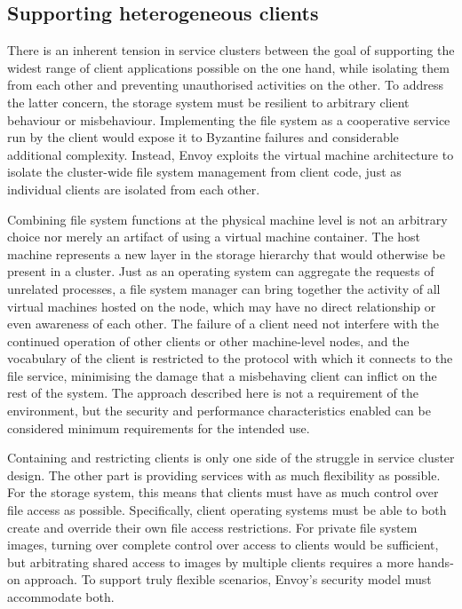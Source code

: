 \subsection{Supporting heterogeneous clients}

There is an inherent tension in service clusters between the goal of supporting the widest range of client applications possible on the one hand, while isolating them from each other and preventing unauthorised activities on the other. To address the latter concern, the storage system must be resilient to arbitrary client behaviour or misbehaviour. Implementing the file system as a cooperative service run by the client would expose it to Byzantine failures and considerable additional complexity. Instead, Envoy exploits the virtual machine architecture to isolate the cluster-wide file system management from client code, just as individual clients are isolated from each other.

Combining file system functions at the physical machine level is not an arbitrary choice nor merely an artifact of using a virtual machine container. The host machine represents a new layer in the storage hierarchy that would otherwise be present in a cluster. Just as an operating system can aggregate the requests of unrelated processes, a file system manager can bring together the activity of all virtual machines hosted on the node, which may have no direct relationship or even awareness of each other. The failure of a client need not interfere with the continued operation of other clients or other machine-level nodes, and the vocabulary of the client is restricted to the protocol with which it connects to the file service, minimising the damage that a misbehaving client can inflict on the rest of the system. The approach described here is not a requirement of the environment, but the security and performance characteristics enabled can be considered minimum requirements for the intended use.

Containing and restricting clients is only one side of the struggle in service cluster design. The other part is providing services with as much flexibility as possible. For the storage system, this means that clients must have as much control over file access as possible. Specifically, client operating systems must be able to both create and override their own file access restrictions. For private file system images, turning over complete control over access to clients would be sufficient, but arbitrating shared access to images by multiple clients requires a more hands-on approach. To support truly flexible scenarios, Envoy's security model must accommodate both.

